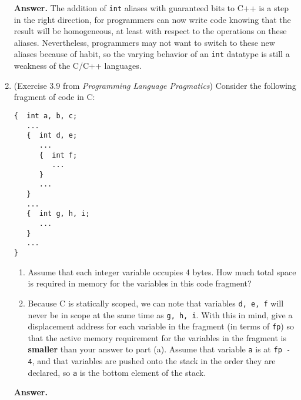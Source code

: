\documentclass[9pt]{article}
\begin{document}
\begin{enumerate}
   \textbf{Answer.} The addition of \verb|int| aliases with guaranteed bits to C++ is a
   step in the right direction, for programmers can now write code knowing that
   the result will be homogeneous, at least with respect to the operations on
   these aliases. Nevertheless, programmers may not want to switch to
   these new aliases because of habit, so the varying behavior of an \verb|int|
   datatype is still a weakness of the C/C++ languages.
   \item (Exercise 3.9 from \textit{Programming Language Pragmatics}) Consider
         the following fragment of code in C:
         \begin{verbatim}
{  int a, b, c;
   ...
   {  int d, e;
      ...
      {  int f;
         ...
      }
      ...
   }
   ...
   {  int g, h, i;
      ...
   }
   ...
}
         \end{verbatim}
         \begin{enumerate}
            \item Assume that each integer variable occupies 4 bytes. How much
                  total space is required in memory for the variables in this 
                  code fragment?
            \item Because C is statically scoped, we can note that variables
                  \verb|d, e, f| will never be in scope at the same time as
                  \verb|g, h, i|. With this in mind, give a displacement address
                  for each variable in the fragment (in terms of \verb|fp|) so 
                  that the active memory requirement for the variables in the 
                  fragment is \textbf{smaller} than your answer to part (a). 
                  Assume that variable \verb|a| is at \verb|fp - 4|, and that 
                  variables are pushed onto the stack in the order they are 
                  declared, so \verb|a| is the bottom element of the stack.
         \end{enumerate}

   \textbf{Answer.}


\end{enumerate}
\end{document}
